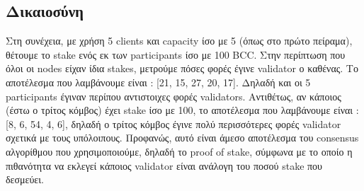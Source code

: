 \documentclass[12pt, a4paper]{article}
\begin{document}
	\subsection{Δικαιοσύνη}
	Στη συνέχεια, με χρήση 5 clients και capacity ίσο με 5 (όπως στο πρώτο πείραμα), θέτουμε το stake ενός εκ των participants ίσο με 100 BCC. Στην περίπτωση που όλοι οι nodes είχαν ίδια stakes, μετρούμε πόσες φορές έγινε validator ο καθένας. Το αποτέλεσμα που λαμβάνουμε είναι : [21, 15, 27, 20, 17]. Δηλαδή και οι 5 participants έγιναν περίπου αντιστοιχες φορές validators. Αντιθέτως, αν κάποιος (έστω ο τρίτος κόμβος) έχει stake ίσο με 100, το αποτέλεσμα που λαμβάνουμε είναι : [8, 6, 54, 4, 6], δηλαδή ο τρίτος κόμβος έγινε πολύ περισσότερες φορές validator σχετικά με τους υπόλοιπους. Προφανώς, αυτό είναι άμεσο αποτέλεσμα του consensus αλγορίθμου που χρησιμοποιούμε, δηλαδή το proof of stake, σύμφωνα με το οποίο η πιθανότητα να εκλεγεί κάποιος validator είναι ανάλογη του ποσού stake που δεσμεύει. 
\end{document}
